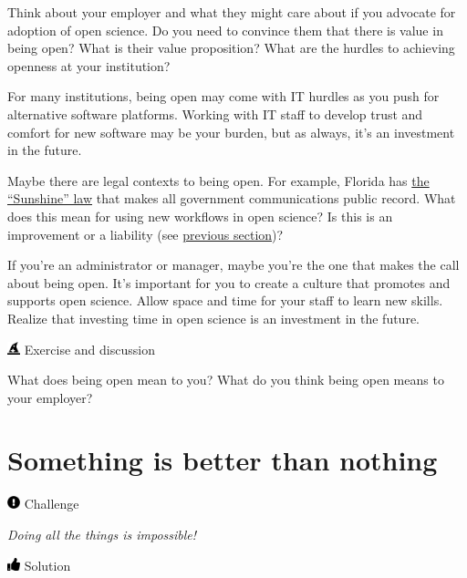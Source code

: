 \documentclass[
  letterpaper,
  DIV=11,
  numbers=noendperiod]{scrreprt}
\begin{document}
Think about your employer and what they might care about if you advocate
for adoption of open science. Do you need to convince them that there is
value in being open? What is their value proposition? What are the
hurdles to achieving openness at your institution?

For many institutions, being open may come with IT hurdles as you push
for alternative software platforms. Working with IT staff to develop
trust and comfort for new software may be your burden, but as always,
it's an investment in the future.

Maybe there are legal contexts to being open. For example, Florida has
\href{https://myfloridalegal.com/pages.nsf/Main/DC0B20B7DC22B7418525791B006A54E4}{the
``Sunshine'' law} that makes all government communications public
record. What does this mean for using new workflows in open science? Is
this is an improvement or a liability (see
\protect\hyperlink{fear-of-exposure}{previous section})?

If you're an administrator or manager, maybe you're the one that makes
the call about being open. It's important for you to create a culture
that promotes and supports open science. Allow space and time for your
staff to learn new skills. Realize that investing time in open science
is an investment in the future.

\includegraphics[width=1em,height=1em]{./implement_files/figure-pdf/fa-icon-20d474448f872ee43905e611a2502347.pdf}
Exercise and discussion

What does being open mean to you? What do you think being open means to
your employer?

\hypertarget{something-is-better-than-nothing}{%
\section{Something is better than
nothing}\label{something-is-better-than-nothing}}

\includegraphics[width=1em,height=1em]{./implement_files/figure-pdf/fa-icon-e38cc40f3c6469ef5f44a7764a5c5910.pdf}
Challenge

\emph{Doing all the things is impossible!}

\includegraphics[width=1em,height=1em]{./implement_files/figure-pdf/fa-icon-e4ee65476be467d7be8a1ae9cb02ffda.pdf}
Solution
\end{document}
